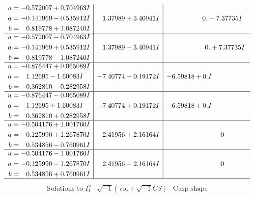 \documentclass[1p]{elsarticle_modified}
\theoremstyle{definition}
\newcommand{\I}{\sqrt{-1}}
\begin{document}
$$\begin{array}{c|c|c}
\begin{aligned}
u &= -0.572007 + 0.704963 I \\
a &= -0.141969 - 0.535912 I \\
b &= \phantom{-}0.819778 + 1.087240 I\end{aligned}
 & \phantom{-}1.37989 + 3.40941 I & \phantom{-0.000000 } 0. - 7.37735 I \\ \hline\begin{aligned}
u &= -0.572007 - 0.704963 I \\
a &= -0.141969 + 0.535912 I \\
b &= \phantom{-}0.819778 - 1.087240 I\end{aligned}
 & \phantom{-}1.37989 - 3.40941 I & \phantom{-0.000000 -}0. + 7.37735 I \\ \hline\begin{aligned}
u &= -0.876447 + 0.065089 I \\
a &= \phantom{-}1.12695 - 1.60083 I \\
b &= \phantom{-}0.362810 - 0.282958 I\end{aligned}
 & -7.40774 - 0.19172 I & -6.59818 + 0. I\phantom{ +0.000000I} \\ \hline\begin{aligned}
u &= -0.876447 - 0.065089 I \\
a &= \phantom{-}1.12695 + 1.60083 I \\
b &= \phantom{-}0.362810 + 0.282958 I\end{aligned}
 & -7.40774 + 0.19172 I & -6.59818 + 0. I\phantom{ +0.000000I} \\ \hline\begin{aligned}
u &= -0.504176 + 1.001760 I \\
a &= -0.125990 + 1.267870 I \\
b &= \phantom{-}0.534856 - 0.760961 I\end{aligned}
 & \phantom{-}2.41956 + 2.16164 I & \phantom{-0.000000 } 0 \\ \hline\begin{aligned}
u &= -0.504176 - 1.001760 I \\
a &= -0.125990 - 1.267870 I \\
b &= \phantom{-}0.534856 + 0.760961 I\end{aligned}
 & \phantom{-}2.41956 - 2.16164 I & \phantom{-0.000000 } 0\\
 \hline 
 \end{array}$$\newpage$$\begin{array}{c|c|c}  
\text{Solutions to }I^u_{1}& \I (\text{vol} + \sqrt{-1}CS) & \text{Cusp shape}\\

\end{array}$$
\end{document}
